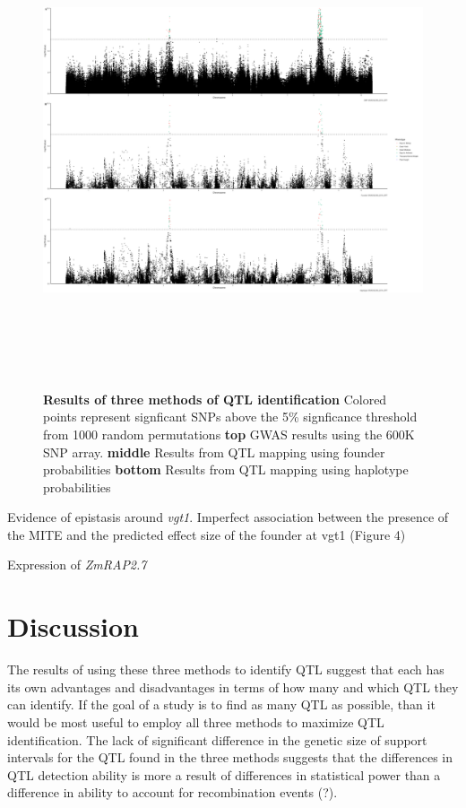 \documentclass[article,9pt,twocolumn,twoside]{rilabRxiv}
\begin{document}
\begin{figure}[hb!]
\includegraphics[width=\textwidth,height=14cm]{figures/Methods_Fig3.png}
\caption{\textbf{Results of three methods of QTL identification} Colored points represent signficant SNPs above the 5\% signficance threshold from 1000 random permutations \textbf{top} GWAS results using the 600K SNP array. \textbf{middle} Results from QTL mapping using founder probabilities \textbf{bottom} Results from QTL mapping using haplotype probabilities}
\label{fig:figure3}
\end{figure}

Evidence of epistasis around \emph{vgt1}. Imperfect association between the presence of the MITE and the predicted effect size of the founder at vgt1 (Figure 4)


Expression of \emph{ZmRAP2.7}


\section{Discussion}
The results of using these three methods to identify QTL suggest that each has its own advantages and disadvantages in terms of how many and which QTL they can identify. If the goal of a study is to find as many QTL as possible, than it would be most useful to employ all three methods to maximize QTL identification.
The lack of significant difference in the genetic size of support intervals for the QTL found in the three methods suggests that the differences in QTL detection ability is more a result of differences in statistical power than a difference in ability to account for recombination events (?).
\end{document}
